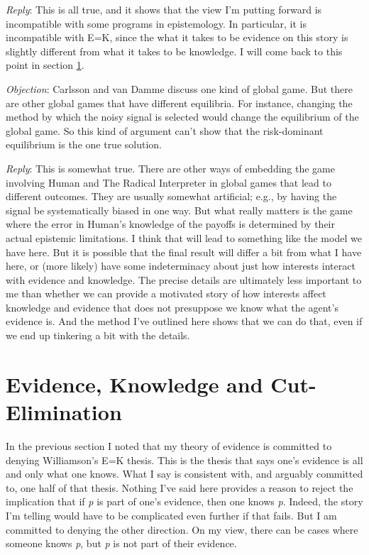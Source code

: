 \documentclass[
  11pt,
]{book}
\begin{document}
\emph{Reply}: This is all true, and it shows that the view I'm putting forward is incompatible with some programs in epistemology. In particular, it is incompatible with E=K, since the what it takes to be evidence on this story is slightly different from what it takes to be knowledge. I will come back to this point in section \ref{cutelim}.

\emph{Objection}: Carlsson and van Damme discuss one kind of global game. But there are other global games that have different equilibria. For instance, changing the method by which the noisy signal is selected would change the equilibrium of the global game. So this kind of argument can't show that the risk-dominant equilibrium is the one true solution.

\emph{Reply}: This is somewhat true. There are other ways of embedding the game involving Human and The Radical Interpreter in global games that lead to different outcomes. They are usually somewhat artificial; e.g., by having the signal be systematically biased in one way. But what really matters is the game where the error in Human's knowledge of the payoffs is determined by their actual epistemic limitations. I think that will lead to something like the model we have here. But it is possible that the final result will differ a bit from what I have here, or (more likely) have some indeterminacy about just how interests interact with evidence and knowledge. The precise details are ultimately less important to me than whether we can provide a motivated story of how interests affect knowledge and evidence that does not presuppose we know what the agent's evidence is. And the method I've outlined here shows that we can do that, even if we end up tinkering a bit with the details.

\hypertarget{cutelim}{%
\section{Evidence, Knowledge and Cut-Elimination}\label{cutelim}}

In the previous section I noted that my theory of evidence is committed to denying Williamson's E=K thesis. This is the thesis that says one's evidence is all and only what one knows. What I say is consistent with, and arguably committed to, one half of that thesis. Nothing I've said here provides a reason to reject the implication that if \emph{p} is part of one's evidence, then one knows \emph{p}. Indeed, the story I'm telling would have to be complicated even further if that fails. But I am committed to denying the other direction. On my view, there can be cases where someone knows \emph{p}, but \emph{p} is not part of their evidence.
\end{document}
